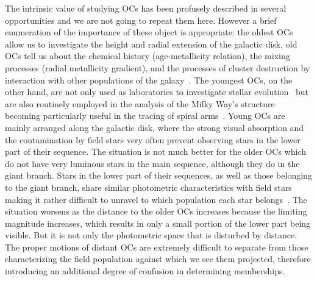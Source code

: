 \documentclass[referee]{aa}
\begin{document}
 The intrinsic value of studying OCs has been profusely described in several
 opportunities and we are not going to repeat them here. However a brief
 enumeration of the importance of these object is appropriate: the oldest OCs
 allow us to investigate the height and radial extension of the galactic disk,
 old OCs tell us about the chemical history (age-metallicity relation), the
 mixing processes (radial metallicity gradient), and the processes of cluster
 destruction by interaction with other populations of the
 galaxy~\citep{Friel1995,Tosi_2004,Hayes_2015}.
 The youngest OCs, on the other hand, are not only used as laboratories to
 investigate stellar evolution~\citep[they allow studying in detail the boundary
 conditions necessary to create new generations of stars, ][]{Lada2003} but are
 also routinely employed in the analysis of the Milky Way's
 structure~\citep{Loktin_1992,Moitinho_2006,Vazquez2008,Moitinho_2010}
 becoming particularly useful in the tracing of spiral
 arms~\citep{carraro_2013,Molina_2018}.
 Young OCs are mainly arranged along the galactic disk, where the strong visual
 absorption and the contamination by field stars very often prevent observing
 stars in the lower part of their sequence.
 The situation is not much better for the older OCs which do not
 have very luminous stars in the main sequence, although they do in the giant
 branch. Stars in the lower part of their sequences, as well as those belonging
 to the giant branch, share similar photometric characteristics with field stars
 making it rather difficult to unravel to which population each star
 belongs~\citep{Hayes_2015}.
 The situation worsens as the distance to the older OCs increases because the
 limiting magnitude increases, which results in only a small portion of
 the lower part being visible. But it is not only the photometric
 space that is disturbed by distance. The proper motions of distant OCs are
 extremely difficult to separate from those characterizing the field
 population against which we see them projected, therefore introducing an
 additional degree of confusion in determining memberships.
\end{document}
